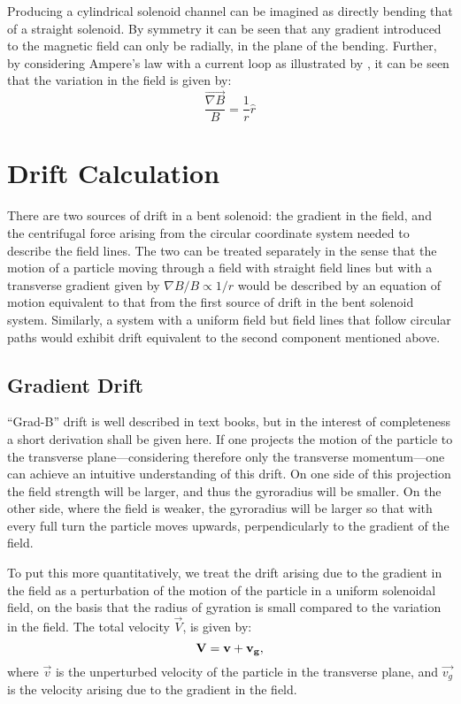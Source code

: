 Producing a cylindrical solenoid  channel can be imagined as directly bending that of a straight solenoid.
By symmetry it can be seen that any gradient introduced to the magnetic field can only be radially, in the plane of the bending.
Further, by considering Ampere's law with a current loop as illustrated by , it can be seen that the variation in the field is given by:
\begin{equation}
\frac{\vec{\nabla B}}{B}=\frac{1}{r}\hat{r}
\end{equation}

\section{Drift Calculation}
There are two sources of drift in a bent solenoid: the gradient in the field, and the centrifugal force arising from the circular coordinate system needed to describe the field lines.
The two can be treated separately in the sense that the motion of a particle moving through a field with straight field lines but with a transverse gradient given by $\nabla B/ B \propto 1/r$ would be described by an equation of motion equivalent to that from the first source of drift in the bent solenoid system. 
Similarly, a system with a uniform field but field lines that follow circular paths would exhibit drift equivalent to the second component mentioned above.

\subsection{Gradient Drift}
``Grad-B'' drift is well described in text books, but in the interest of completeness a short derivation shall be given here.
If one projects the motion of the particle to the transverse plane---considering therefore only the transverse momentum---one can achieve an intuitive understanding of this drift.
On one side of this projection the field strength will be larger, and thus the gyroradius will be smaller.
On the other side, where the field is weaker, the gyroradius will be larger so that with every full turn the particle moves upwards, perpendicularly to the gradient of the field.

To put this more quantitatively, we treat
the drift arising due to the gradient in the field as a perturbation of the motion of the particle in a uniform solenoidal field, on the basis that the radius of gyration is small compared to the variation in the field.
The total velocity $\vec{V}$, is given by:
\begin{equation}
\vec{V}=\vec{v}+\vec{v_g},
\eqlabel{velocity-grad}
\end{equation}
where $\vec{v}$ is the unperturbed velocity of the particle in the transverse plane, and $\vec{v_g}$ is the velocity arising due to the gradient in the field.

